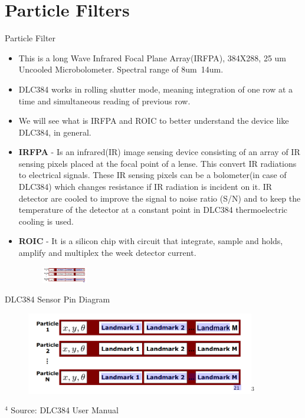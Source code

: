 \documentclass{beamer}
\begin{document}
\section{Particle Filters}
\begin{frame}{Particle Filter}
    \begin{itemize}
        \item This is a long Wave Infrared Focal Plane Array(IRFPA), 384X288, 25 um Uncooled Microbolometer. Spectral range of 8um~14um.
        \item DLC384 works in rolling shutter mode, meaning integration of one row at a time and simultaneous reading of previous row.
        \item We will see what is IRFPA and ROIC to better understand the device like DLC384, in general.
        \item \textbf{IRFPA} - Is an infrared(IR) image sensing device consisting of an array of IR sensing pixels placed at the focal point of a lense. This convert IR radiations to electrical signals. These IR sensing pixels can be a bolometer(in case of DLC384) which changes resistance if IR radiation is incident on it. IR detector are cooled to improve the signal to noise ratio (S/N) and to keep the temperature of the detector at a constant point in DLC384 thermoelectric cooling is used.
        \item \textbf{ROIC} - It is a silicon chip with circuit that integrate, sample and holds, amplify and multiplex the week detector current. %
        \begin{figure}
            \hfil
            \hfil
            \includegraphics[width = 20mm]{RBPF_SLAM.png}
        \end{figure}
    \end{itemize}
\end{frame}


\begin{frame}{DLC384 Sensor Pin Diagram}
   \begin{figure}
            \centering
            \includegraphics[width=100mm]{RBPF_SLAM.png}$^{3}$
    \end{figure}
\vfill
\tiny{$^{4}$} Source: DLC384 User Manual
\end{frame}
\end{document}
